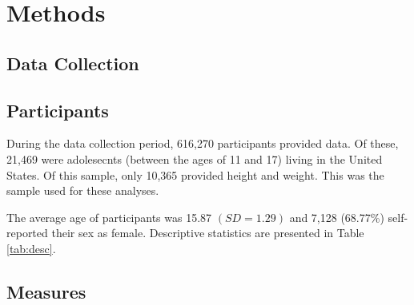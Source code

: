 \documentclass[man]{apa6}
\begin{document}
\hypertarget{methods}{%
\section{Methods}\label{methods}}

\hypertarget{data-collection}{%
\subsection{Data Collection}\label{data-collection}}

\hypertarget{participants}{%
\subsection{Participants}\label{participants}}

During the data collection period, 616,270 participants provided data. Of these, 21,469 were adolesecnts (between the ages of 11 and 17) living in the United States. Of this sample, only 10,365 provided height and weight. This was the sample used for these analyses.

The average age of participants was 15.87 \((SD = 1.29)\) and 7,128 (68.77\%) self-reported their sex as female. Descriptive statistics are presented in Table \ref{tab:desc}.

\hypertarget{measures}{%
\subsection{Measures}\label{measures}}
\end{document}
